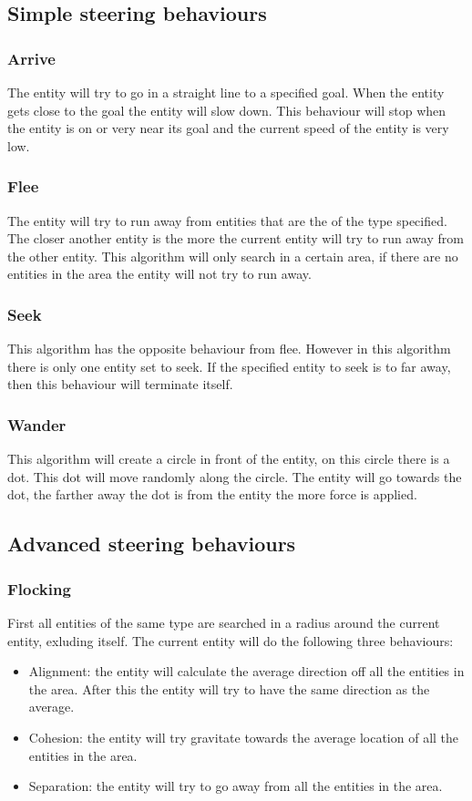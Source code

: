 \documentclass[10pt]{extarticle} %
\begin{document}
   \subsection{Simple steering behaviours}
   \subsubsection {Arrive}
   The entity will try to go in a straight line to a specified goal. When the entity gets close to the goal the entity will slow down. This behaviour will stop when the entity is on or very near its goal and the current speed of the entity is very low. 
   \subsubsection {Flee}
   The entity will try to run away from entities that are the of the type specified. The closer another entity is the more the current entity will try to run away from the other entity. This algorithm will only search in a certain area, if there are no entities in the area the entity will not try to run away.
   \subsubsection {Seek}
   This algorithm has the opposite behaviour from flee. However in this algorithm there is only one entity set to seek. If the specified entity to seek is to far away, then this behaviour will terminate itself.
   \subsubsection {Wander}
  This algorithm will create a circle in front of the entity, on this circle there is a dot. This dot will move randomly along the circle. The entity will go towards the dot, the farther away the dot is from the entity the more force is applied. 
  \subsection{Advanced steering behaviours}
  \subsubsection {Flocking}
  First all entities of the same type are searched in a radius around the current entity, exluding itself. The current entity will do the following three behaviours: 
  \begin{itemize}
  \item Alignment: the entity will calculate the average direction off all the entities in the area. After this the entity will try to have the same direction as the average.
  \item Cohesion: the entity will try gravitate towards the average location of all the entities in the area.
  \item Separation: the entity  will try to go away from all the entities in the area. 
  \end{itemize}
\end{document}
